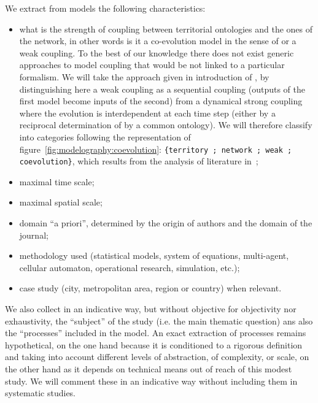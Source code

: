 \documentclass[10pt]{article}
\begin{document}
We extract from models the following characteristics:

\begin{itemize}
	\item what is the strength of coupling between territorial ontologies and the ones of the network, in other words is it a co-evolution model in the sense of \cite{raimbault2018caracterisation} or a weak coupling. To the best of our knowledge there does not exist generic approaches to model coupling that would be not linked to a particular formalism. We will take the approach given in introduction of \cite{raimbault2018caracterisation}, by distinguishing here a weak coupling as a sequential coupling (outputs of the first model become inputs of the second) from a dynamical strong coupling where the evolution is interdependent at each time step (either by a reciprocal determination of by a common ontology). We will therefore classify into categories following the representation of figure~\ref{fig:modelography:coevolution}: \texttt{\{territory ; network ; weak ; coevolution\}}, which results from the analysis of literature in~\cite{raimbault2018caracterisation};
	\item maximal time scale;
	\item maximal spatial scale;
	\item domain ``a priori'', determined by the origin of authors and the domain of the journal;
	\item methodology used (statistical models, system of equations, multi-agent, cellular automaton, operational research, simulation, etc.);
	\item case study (city, metropolitan area, region or country) when relevant.
\end{itemize}

We also collect in an indicative way, but without objective for objectivity nor exhaustivity, the ``subject'' of the study (i.e. the main thematic question) ans also the ``processes'' included in the model. An exact extraction of processes remains hypothetical, on the one hand because it is conditioned to a rigorous definition and taking into account different levels of abstraction, of complexity, or scale, on the other hand as it depends on technical means out of reach of this modest study. We will comment these in an indicative way without including them in systematic studies.
\end{document}
